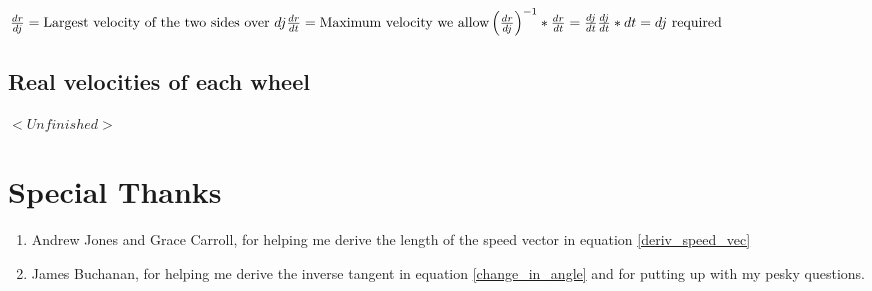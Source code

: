 \documentclass[12pt, english]{article}
\begin{document}
\noindent
\begin{math}
	\frac{dr}{dj} = 
	\text{Largest velocity of the two sides over } dj\\
	\\
	\frac{dr}{dt} = \text{Maximum velocity we allow} \\
	\\
	\left(\frac{dr}{dj}\right)^{-1} * \frac{dr}{dt} = \frac{dj}{dt} \\
	\\
	\frac{dj}{dt} * dt = dj \text{ required}
\end{math}

\subsection{Real velocities of each wheel}
$<Unfinished>$

\section{Special Thanks}
\begin{enumerate}
	\item Andrew Jones and Grace Carroll, for helping me derive the length of the speed vector in equation \ref{deriv_speed_vec}
	\item James Buchanan, for helping me derive the inverse tangent in equation \ref{change_in_angle} and for putting up with my pesky questions.
\end{enumerate}
\end{document}
